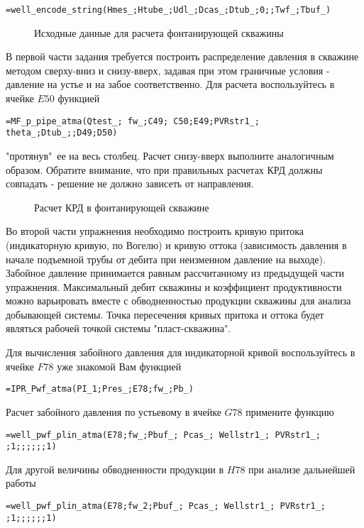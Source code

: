 { \small  \texttt{=well\_encode\_string(Hmes\_;Htube\_;Udl\_;Dcas\_;Dtub\_;0;;Twf\_;Tbuf\_)
}}

\begin{figure}[h!]
	\center{\texttt{[image: Ex90\_1]}}
	\caption{Исходные данные для расчета фонтанирующей скважины}
	\label{ris:Ex90_1}
\end{figure}

В первой части задания требуется построить распределение давления в скважине методом сверху-вниз и снизу-вверх, задавая при этом граничные условия - давление на устье и на забое соответственно. Для расчета воспользуйтесь в ячейке $E50$ функцией

{ \small  \texttt{=MF\_p\_pipe\_atma(Qtest\_; fw\_;C49; C50;E49;PVRstr1\_; theta\_;Dtub\_;;D49;D50)
}}

"протянув"\ ее на весь столбец. Расчет снизу-вверх выполните аналогичным образом. Обратите внимание, что при правильных расчетах КРД должны совпадать - решение не должно зависеть от направления.

\begin{figure}[h!]
	\center{\texttt{[image: Ex90\_2]}}
	\caption{Расчет КРД в фонтанирующей скважине}
	\label{ris:Ex90_2}
\end{figure}

Во второй части упражнения необходимо построить кривую притока (индикаторную кривую, по Вогелю) и кривую оттока (зависимость давления в начале подъемной трубы от дебита при неизменном давление на выходе). Забойное давление принимается равным рассчитанному из предыдущей части упражнения. Максимальный дебит скважины и коэффициент продуктивности можно варьировать вместе с обводненностью продукции скважины для анализа добывающей системы. Точка пересечения кривых притока и оттока будет являться рабочей точкой системы "пласт-скважина".

Для вычисления забойного давления для индикаторной кривой воспользуйтесь в ячейке $F78$ уже знакомой Вам функцией

{ \small  \texttt{=IPR\_Pwf\_atma(PI\_1;Pres\_;E78;fw\_;Pb\_)}}

Расчет забойного давления по устьевому в ячейке $G78$ примените функцию
 
{ \small  \texttt{=well\_pwf\_plin\_atma(E78;fw\_;Pbuf\_; Pcas\_; Wellstr1\_; PVRstr1\_; ;1;;;;;;1)}} 

Для другой величины обводненности продукции в $H78$ при анализе дальнейшей работы

{ \small  \texttt{=well\_pwf\_plin\_atma(E78;fw\_2;Pbuf\_; Pcas\_; Wellstr1\_; PVRstr1\_; ;1;;;;;;1)}} 


